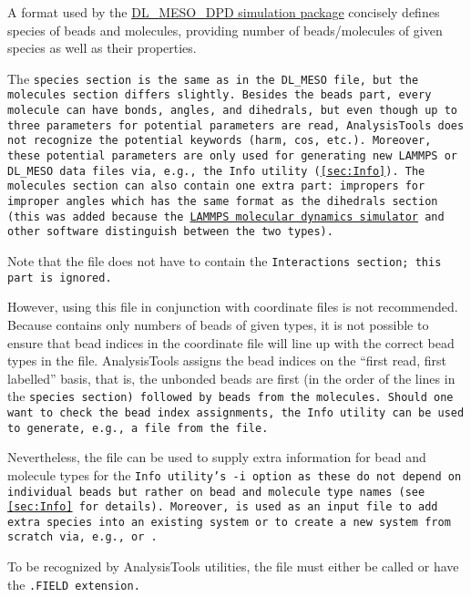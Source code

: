 A format used by the
\href{https://www.scd.stfc.ac.uk/Pages/DL_MESO.aspx}{DL_MESO_DPD simulation
package} concisely defines species of beads and molecules, providing number of
beads/molecules of given species as well as their properties.

The \tt{species} section is the same as in the \tt{DL_MESO} \field file, but the
\tt{molecules} section differs slightly. Besides the \tt{beads} part, every
molecule can have \tt{bonds}, \tt{angles}, and \tt{dihedrals}, but even though
up to three parameters for potential parameters are read, AnalysisTools does not
recognize the potential keywords (\tt{harm}, \tt{cos}, etc.). Moreover, these
potential parameters are only used for generating new \tt{LAMMPS} or
\tt{DL_MESO} data files via, e.g., the \tt{Info} utility (\cref{sec:Info}). The
\tt{molecules} section can also contain one extra part: \tt{impropers} for
improper angles which has the same format as the \tt{dihedrals} section (this
was added because the \href{https://lammps.sandia.gov/}{LAMMPS molecular
dynamics simulator} and other software distinguish between the two types).

Note that the \field file does not have to contain the \tt{Interactions}
section; this part is ignored.

However, using this file in conjunction with coordinate files is not
recommended. Because \field contains only numbers of beads of given types, it is
not possible to ensure that bead indices in the coordinate file will line up
with the correct bead types in the \field file. AnalysisTools assigns the bead
indices on the \enquote{first read, first labelled} basis, that is, the unbonded
beads are first (in the order of the lines in the \tt{species} section) followed
by beads from the molecules. Should one want to check the bead index
assignments, the \tt{Info} utility can be used to generate, e.g., a \vsf file
from the \field file.

Nevertheless, the file can be used to supply extra information for bead and
molecule types for the \tt{Info} utility's \tt{-i} option as these do not
depend on individual beads but rather on bead and molecule type names (see
\cref{sec:Info} for details). Moreover, \field is used as an input file to add
extra species into an existing system or to create a new system from scratch
via, e.g.,  or .

To be recognized by AnalysisTools utilities, the file must either be called
\field or have the \tt{.FIELD} extension.

